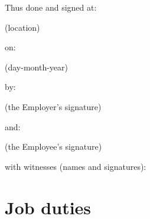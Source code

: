 \documentclass[a4paper,11pt]{article}
\begin{document}
\vspace{1cm}

\begin{center}
  Thus done and signed at:

  \vspace{0.5cm}


  (location)

  \vspace{1cm}

  on:

  \vspace{0.5cm}


  (day-month-year)

  \vspace{1cm}

  by:

  \vspace{0.5cm}


  (the Employer's signature)

  \vspace{1cm}

  and:

  \vspace{0.5cm}


  (the Employee's signature)

  \vspace{1cm}

  with witnesses (names and signatures):

  \vspace{0.5cm}


  \vspace{0.5cm}


\end{center}

\pagebreak

\appendix

\section{Job duties}
\label{job-duties}
\end{document}
